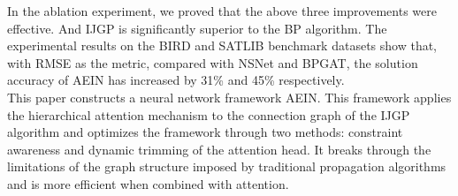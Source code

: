 In the ablation experiment, we proved that the above three improvements were effective. And IJGP is significantly superior to 
the BP algorithm. The experimental results on the BIRD and SATLIB benchmark datasets show that, with RMSE as the metric, compared 
with NSNet and BPGAT, the solution accuracy of AEIN has increased by 31\% and 45\% respectively.\\

This paper constructs a neural network framework AEIN. This framework applies the hierarchical attention mechanism to the 
connection graph of the IJGP algorithm and optimizes the framework through two methods: constraint awareness and dynamic 
trimming of the attention head. It breaks through the limitations of the graph structure imposed by traditional propagation 
algorithms and is more efficient when combined with attention.
